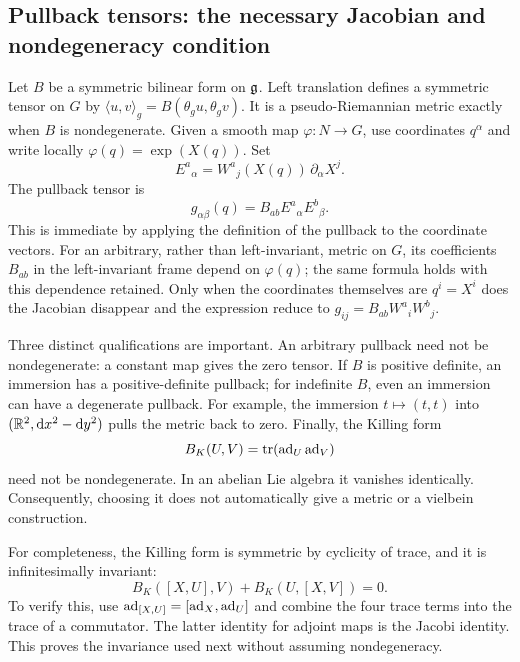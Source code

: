 \subsection{Pullback tensors: the necessary Jacobian and nondegeneracy condition}
Let $B$ be a symmetric bilinear form on $\mathfrak g$. Left translation defines a symmetric tensor on $G$ by
$\langle u,v\rangle_g=B(\theta_g u,\theta_g v)$.
It is a pseudo-Riemannian metric exactly when $B$ is nondegenerate. Given a smooth map $\varphi:N\to G$, use coordinates $q^\alpha$ and write locally
$\varphi(q)=\exp(X(q))$. Set
\begin{equation}\label{eq:pullback-frame}
 E^a{}_\alpha=W^a{}_j(X(q))\,\partial_\alpha X^j.
\end{equation}
The pullback tensor is
\begin{equation}\label{eq:pullback-metric}
 g_{\alpha\beta}(q)=B_{ab}E^a{}_\alpha E^b{}_\beta.
\end{equation}
This is immediate by applying the definition of the pullback to the coordinate vectors. For an arbitrary, rather than left-invariant, metric on $G$, its coefficients $B_{ab}$ in the left-invariant frame depend on $\varphi(q)$; the same formula holds with this dependence retained. Only when the coordinates themselves are $q^i=X^i$ does the Jacobian disappear and the expression reduce to $g_{ij}=B_{ab}W^a{}_iW^b{}_j$.

Three distinct qualifications are important. An arbitrary pullback need not be nondegenerate: a constant map gives the zero tensor. If $B$ is positive definite, an immersion has a positive-definite pullback; for indefinite $B$, even an immersion can have a degenerate pullback. For example, the immersion $t\mapsto(t,t)$ into $(\mathbb R^2,\mathrm d x^2-\mathrm d y^2)$ pulls the metric back to zero. Finally, the Killing form
\begin{equation}\label{eq:killing}
 B_K(U,V)=\operatorname{tr}(\operatorname{ad}_U\operatorname{ad}_V)
\end{equation}
need not be nondegenerate. In an abelian Lie algebra it vanishes identically. Consequently, choosing it does not automatically give a metric or a vielbein construction.

For completeness, the Killing form is symmetric by cyclicity of trace, and it is infinitesimally invariant:
\begin{equation}\label{eq:B-invariant}
 B_K([X,U],V)+B_K(U,[X,V])=0.
\end{equation}
To verify this, use $\operatorname{ad}_{[X,U]}=[\operatorname{ad}_X,\operatorname{ad}_U]$ and combine the four trace terms into the trace of a commutator. The latter identity for adjoint maps is the Jacobi identity. This proves the invariance used next without assuming nondegeneracy.

